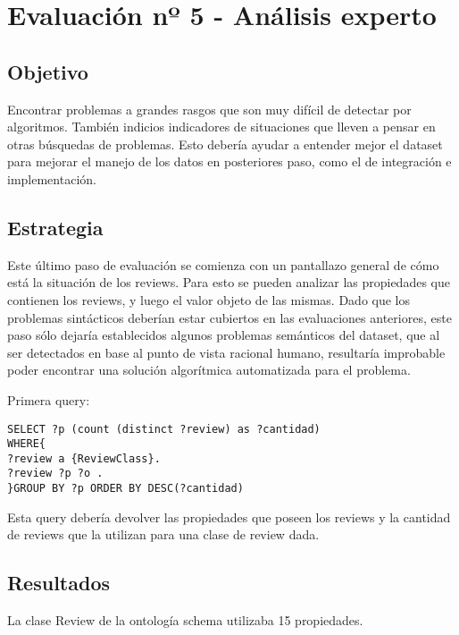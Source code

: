 \section{Evaluación nº 5 - Análisis experto}
\label{section:evaluacion-analisis}

\subsection*{Objetivo} Encontrar problemas a grandes rasgos que son muy difícil de detectar por algoritmos. También indicios indicadores de 
situaciones que lleven a pensar en otras búsquedas de problemas. Esto debería ayudar a entender mejor el dataset para mejorar el manejo 
de los datos en posteriores paso, como el de integración e implementación.

\subsection*{Estrategia} Este último paso de evaluación se comienza con un pantallazo general de cómo está la situación de los reviews. Para esto se pueden analizar las propiedades que contienen los reviews, y luego el valor objeto 
de las mismas. Dado que los problemas sintácticos deberían estar cubiertos en las evaluaciones anteriores, este paso sólo dejaría establecidos
algunos problemas semánticos del dataset, que al ser detectados en base al punto de vista racional humano, resultaría improbable poder encontrar
una solución algorítmica automatizada para el problema.

Primera query:

\begin{lstlisting}[frame=single]
SELECT ?p (count (distinct ?review) as ?cantidad) 
WHERE{
?review a {ReviewClass}.
?review ?p ?o .
}GROUP BY ?p ORDER BY DESC(?cantidad)
\end{lstlisting}

Esta query debería devolver las propiedades que poseen los reviews y la cantidad de reviews que la utilizan para una clase de review dada.

\subsection*{Resultados}

La clase Review de la ontología schema utilizaba 15 propiedades. 

